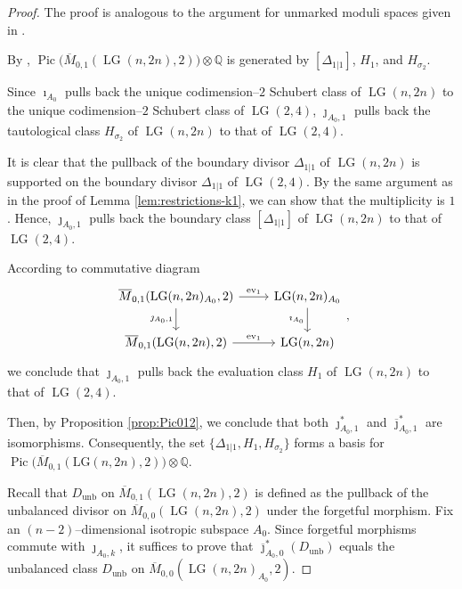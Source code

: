 \documentclass[10pt]{amsart}
\theoremstyle{definition}
\newcommand{\LG}{\operatorname{LG}}
\newcommand{\ev}{\operatorname{ev}}
\newcommand{\QQ}{\mathbb{Q}}
\DeclareMathOperator{\unb}{unb}
\theoremstyle{plain} %
\begin{document}
\begin{proof}
The proof is analogous to the argument for unmarked moduli spaces given in \cite[Proposition 6.4]{CM}.

By \cite[Proposition~1]{Op05}, $\operatorname{Pic}\bigl(\overline{M}_{0,1}(\LG(n,2n),2)\bigr)\otimes\QQ$ is generated by $[\Delta_{1|1}]$,  $H_1$, and  $H_{\sigma_2}$.

Since  $\imath_{A_0}$ pulls back the unique codimension--$2$ Schubert class of $\LG(n,2n)$ to the unique codimension--$2$ Schubert class of $\LG(2,4)$, $\jmath_{A_0,1}$ pulls back the tautological class $H_{\sigma_2}$ of $\LG(n,2n)$ to that of $\LG(2,4)$.

It is clear that
the pullback of the boundary divisor $\Delta_{1|1}$ of $\LG(n,2n)$ is supported on the boundary divisor $\Delta_{1|1}$ of $\LG(2,4)$. By the same argument as in  the proof of Lemma
\ref{lem:restrictions-k1}, we can show that the multiplicity is $1$. Hence, $\jmath_{A_0,1}$ pulls back the boundary class $[\Delta_{1|1}]$ of $\LG(n,2n)$ to that of $\LG(2,4)$.

According to commutative diagram
\begin{equation*}
\begin{tikzcd}
\overline{M}_{0,1}(\LG(n,2n)_{A_0},2) \ar[r, "\ev_1"] \ar[d, "\jmath_{A_0,1}"'] 
& \LG(n,2n)_{A_0} \ar[d, "\imath_{A_0}"'] \\
 \overline{M}_{0,1}(\LG(n,2n),2) \ar[r, "\ev_1"]
& \LG(n,2n)
\end{tikzcd},   
\end{equation*}
we conclude that $\jmath_{A_0,1}$ pulls back the evaluation class $H_1$ of $\LG(n,2n)$ to that of $\LG(2,4)$.

Then, by Proposition \ref{prop:Pic012}, we conclude that both $\jmath_{A_0,1}^*$ and $\overline{\jmath}_{A_0,1}^*$ are isomorphisms. Consequently, the set $\{\Delta_{1|1}, H_1, H_{\sigma_2}\}$ forms a basis for $\operatorname{Pic}\bigl(\overline{M}_{0,1}(\mathrm{LG}(n,2n),2)\bigr) \otimes \mathbb{Q}$.


Recall that $D_{\unb}$ on $\overline{M}_{0,1}(\LG(n,2n),2)$ is defined as the pullback of the unbalanced divisor on $\overline{M}_{0,0}(\LG(n,2n),2)$ under the forgetful morphism. Fix an $(n-2)$--dimensional  isotropic subspace $A_0$. Since forgetful morphisms commute with $\jmath_{A_0,k}$, it suffices to prove that $\overline\jmath_{A_0,0}^*(D_{\unb})$ equals the unbalanced class $D_{\unb}$ on $\overline{M}_{0,0}(\LG(n,2n)_{A_0},2)$.


\end{proof}
\end{document}
